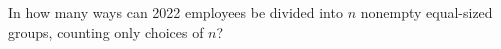 In how many ways can 2022 employees be divided into $n$ nonempty equal-sized groups, counting only choices of $n$?
